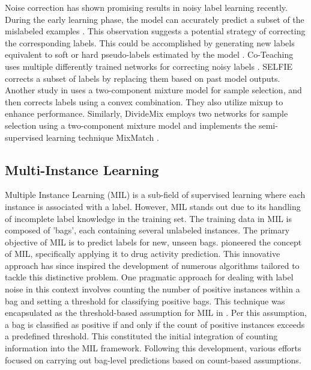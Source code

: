 Noise correction has shown promising results in noisy label learning recently. During the early learning phase, the model can accurately predict a subset of the mislabeled examples \citep{Liu2020EarlyLearningRP}. This observation suggests a potential strategy of correcting the corresponding labels. This could be accomplished by generating new labels equivalent to soft or hard pseudo-labels estimated by the model \citep{tanaka2018joint,yi2019pronoisy}. Co-Teaching uses multiple differently trained networks for correcting noisy labels \citep{Han2018CoteachingRT}. SELFIE \citep{song19b} corrects a subset of labels by replacing them based on past model outputs. Another study in \cite{arazo2019unsupervised} uses a two-component mixture model for sample selection, and then corrects labels using a convex combination. They also utilize mixup \citep{zhang2017mixup} to enhance performance. Similarly, DivideMix \citep{Li2020DivideMixLW} employs two networks for sample selection using a two-component mixture model and implements the semi-supervised learning technique MixMatch \citep{berthelot2019mixmatch}.



\subsection{Multi-Instance Learning}



Multiple Instance Learning (MIL) is a sub-field of supervised learning where each instance is associated with a label. However, MIL stands out due to its handling of incomplete label knowledge in the training set. The training data in MIL is composed of 'bags', each containing several unlabeled instances. The primary objective of MIL is to predict labels for new, unseen bags.
\citet{dietterich1997solving} pioneered the concept of MIL, specifically applying it to drug activity prediction. This innovative approach has since inspired the development of numerous algorithms tailored to tackle this distinctive problem.
One pragmatic approach for dealing with label noise in this context involves counting the number of positive instances within a bag and setting a threshold for classifying positive bags. This technique was encapsulated as the threshold-based assumption for MIL in \citep{foulds2010review}. Per this assumption, a bag is classified as positive if and only if the count of positive instances exceeds a predefined threshold. This constituted the initial integration of counting information into the MIL framework.
Following this development, various efforts \citep{tao2004svm, tao2004extended} focused on carrying out bag-level predictions based on count-based assumptions.

